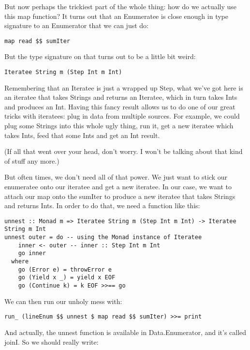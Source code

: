 But now perhaps the trickiest part of the whole thing: how do we actually use this map function? It turns out that an Enumeratee is close enough in type signature to an Enumerator that we can just do:

\begin{lstlisting}
map read $$ sumIter
\end{lstlisting}

But the type signature on that turns out to be a little bit weird:

\begin{lstlisting}
Iteratee String m (Step Int m Int)
\end{lstlisting}

Remembering that an Iteratee is just a wrapped up Step, what we've got here is an iteratee that takes Strings and returns an Iteratee, which in turn takes Ints and produces an Int. Having this fancy result allows us to do one of our great tricks with iteratees: plug in data from multiple sources. For example, we could plug some Strings into this whole ugly thing, run it, get a new iteratee which takes Ints, feed that some Ints and get an Int result.

(If all that went over your head, don't worry. I won't be talking about that kind of stuff any more.)

But often times, we don't need all of that power. We just want to stick our enumeratee onto our iteratee and get a new iteratee. In our case, we want to attach our map onto the sumIter to produce a new iteratee that takes Strings and returns Ints. In order to do that, we need a function like this:

\begin{lstlisting}
unnest :: Monad m => Iteratee String m (Step Int m Int) -> Iteratee String m Int
unnest outer = do -- using the Monad instance of Iteratee
    inner <- outer -- inner :: Step Int m Int
    go inner
  where
    go (Error e) = throwError e
    go (Yield x _) = yield x EOF
    go (Continue k) = k EOF >>== go
\end{lstlisting}

We can then run our unholy mess with:

\begin{lstlisting}
run_ (lineEnum $$ unnest $ map read $$ sumIter) >>= print
\end{lstlisting}

And actually, the unnest function is available in Data.Enumerator, and it's called joinI. So we should really write:

